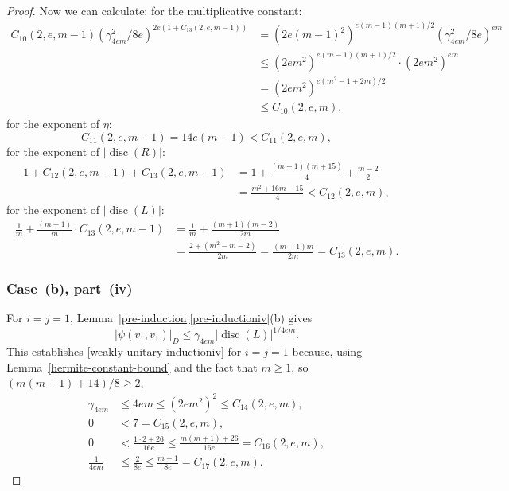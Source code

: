 \documentclass[JEP,XML,SOM,Unicode,NoFloatCountersInSection]{cedram}
\DeclareMathOperator{\disc}{disc}
\newcommand{\abs}[1]{\lvert #1 \rvert}
\begin{document}
\begin{proof}
Now we can calculate:
for the multiplicative constant:
\begin{align*}
C_{10}(2,e,m-1) (\gamma_{4em}^2/8e)^{2e(1+C_{13}(2,e,m-1))}
& = (2e(m-1)^2)^{e(m-1)(m+1)/2} (\gamma_{4em}^2/8e)^{em}
\\& \leq (2em^2)^{e(m-1)(m+1)/2} \cdot (2em^2)^{em}
\\& = (2em^2)^{e(m^2-1 + 2m)/2}
\\& \leq C_{10}(2,e,m),
\end{align*}
for the exponent of $\eta$:
\[
C_{11}(2,e,m-1) = 14e(m-1) < C_{11}(2,e,m),
\]
for the exponent of $\abs{\disc(R)}$:
\begin{align*}
1 + C_{12}(2,e,m-1) + C_{13}(2,e,m-1)
& = 1 + \frac{(m-1)(m+15)}{4} + \frac{m-2}{2}
\\& = \frac{m^2+16m-15}{4} < C_{12}(2,e,m),
\end{align*}
for the exponent of $\abs{\disc(L)}$:
\begin{align*}
\frac{1}{m} + \frac{(m+1)}{m} \cdot C_{13}(2,e,m-1)
& = \frac{1}{m} + \frac{(m+1)(m-2)}{2m}
\\& = \frac{2+(m^2-m-2)}{2m} = \frac{(m-1)m}{2m} = C_{13}(2,e,m).
\end{align*}

\subsubsection*{Case~(b), part~(iv)}
For $i=j=1$, Lemma~\ref{pre-induction}\eqref{pre-inductioniv}(b) gives
\begin{equation} \label{eqn:case-b-iv-base}
\abs{\psi(v_1, v_1)}_D \leq \gamma_{4em} \abs{\disc(L)}^{1/4em}.
\end{equation}
This establishes \eqref{weakly-unitary-inductioniv} for $i=j=1$ because, using Lemma~\ref{hermite-constant-bound} and the fact that $m \geq 1$, so $(m(m+1)+14)/8 \geq 2$,
\begin{align*}
\gamma_{4em}
& \leq 4em \leq (2em^2)^2 \leq C_{14}(2,e,m),
\\[3pt] 0 & < 7 = C_{15}(2,e,m),
\\ 0 & < \frac{1 \cdot 2 + 26}{16e} \leq \frac{m(m+1)+26}{16e} = C_{16}(2,e,m),
\\ \frac{1}{4em} & \leq \frac{2}{8e} \leq \frac{m+1}{8e} = C_{17}(2,e,m).
\end{align*}


\end{proof}
\end{document}
